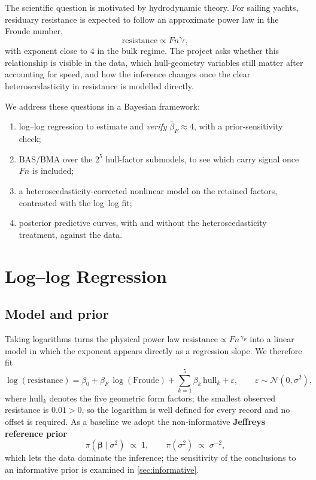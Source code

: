 \documentclass[12pt,a4paper]{article}
\begin{document}
The scientific question is motivated by hydrodynamic theory. For sailing yachts,
residuary resistance is expected to follow an approximate power law in the
Froude number,
\begin{equation}
	\mathrm{resistance}\propto Fn^{\gamma_F},
\end{equation}
with exponent close to $4$ in the bulk regime. The project asks whether this
relationship is visible in the data, which hull-geometry variables still matter
after accounting for speed, and how the inference changes once the clear
heteroscedasticity in resistance is modelled directly.

We address these questions in a Bayesian framework:
\begin{enumerate}
	\setlength\itemsep{1pt}
	\item log--log regression to estimate and \emph{verify} $\hat\beta_F\approx4$, with a prior-sensitivity check;
	\item BAS/BMA over the $2^5$ hull-factor submodels, to see which carry signal once $Fn$ is included;
	\item a heteroscedasticity-corrected nonlinear model on the retained factors, contrasted with the log--log fit;
	\item posterior predictive curves, with and without the heteroscedasticity treatment, against the data.
\end{enumerate}

\section{Log--log Regression}
\label{sec:loglog}

\subsection{Model and prior}

Taking logarithms turns the physical power law $\mathrm{resistance}\propto Fn^{\,\gamma_F}$ into a linear model in which the exponent appears directly as a regression slope. We therefore fit
\begin{equation}
	\log(\mathrm{resistance})
	= \beta_0 + \beta_F\,\log(\mathrm{Froude})
	+ \sum_{k=1}^{5}\beta_k\,\mathrm{hull}_k + \varepsilon,
	\qquad \varepsilon \sim \mathcal{N}(0,\sigma^2),
	\label{eq:loglog}
\end{equation}
where $\mathrm{hull}_k$ denotes the five geometric form factors; the smallest observed resistance is $0.01>0$, so the logarithm is well defined for every record and no offset is required. As a baseline we adopt the non-informative \textbf{Jeffreys reference prior}
\begin{equation}
	\pi(\bm{\beta}\mid\sigma^2)\;\propto\;1,
	\qquad
	\pi(\sigma^2)\;\propto\;\sigma^{-2},
	\label{eq:prior}
\end{equation}
which lets the data dominate the inference; the sensitivity of the conclusions to an informative prior is examined in \cref{sec:informative}.
\end{document}
